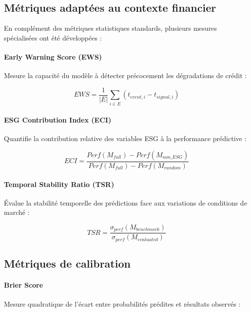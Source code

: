 \subsection{Métriques adaptées au contexte financier}

En complément des métriques statistiques standards, plusieurs mesures spécialisées ont été développées :

\paragraph{Early Warning Score (EWS)}
Mesure la capacité du modèle à détecter précocement les dégradations de crédit :

\begin{equation}
EWS = \frac{1}{|E|} \sum_{i \in E} (t_{event,i} - t_{signal,i})
\end{equation}

\paragraph{ESG Contribution Index (ECI)}
Quantifie la contribution relative des variables ESG à la performance prédictive :

\begin{equation}
ECI = \frac{Perf(M_{full}) - Perf(M_{non\_ESG})}{Perf(M_{full}) - Perf(M_{random})}
\end{equation}

\paragraph{Temporal Stability Ratio (TSR)}
Évalue la stabilité temporelle des prédictions face aux variations de conditions de marché :

\begin{equation}
TSR = \frac{\sigma_{perf}(M_{benchmark})}{\sigma_{perf}(M_{evaluated})}
\end{equation}

\subsection{Métriques de calibration}

\paragraph{Brier Score}
Mesure quadratique de l'écart entre probabilités prédites et résultats observés :

